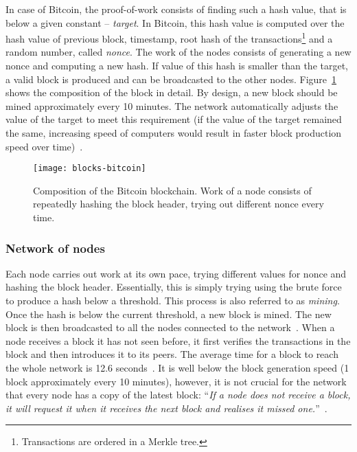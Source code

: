 In case of Bitcoin, the proof-of-work consists of finding such a hash value, that is below a given constant -- \textit{target}. In Bitcoin, this hash value is computed over the hash value of previous block, timestamp\footnotemark, root hash of the transactions\footnote{Transactions are ordered in a Merkle tree.} and a random number, called \textit{nonce}. The work of the nodes consists of generating a new nonce and computing a new hash. If value of this hash is smaller than the target, a valid block is produced and can be broadcasted to the other nodes. Figure~\ref{fig:blocks-bitcoin} shows the composition of the block in detail. By design, a new block should be mined approximately every 10 minutes. The network automatically adjusts the value of the target to meet this requirement (if the value of the target remained the same, increasing speed of computers would result in faster block production speed over time)~\cite{Decker2013InformationNetwork}.
% 
% 
\begin{figure}[ht]
    \centering
    \texttt{[image: blocks-bitcoin]}
    \caption{Composition of the Bitcoin blockchain. Work of a node consists of repeatedly hashing the block header, trying out different nonce every time.}
    \label{fig:blocks-bitcoin}
\end{figure}
% 
\subsubsection{Network of nodes}
Each node carries out work at its own pace, trying different values for nonce and hashing the block header. Essentially, this is simply trying using the brute force to produce a hash below a threshold. This process is also referred to as \textit{mining}. Once the hash is below the current threshold, a new block is mined. The new block is then broadcasted to all the nodes connected to the network~\cite{NakamotoBitcoin:System}. When a node receives a block it has not seen before, it first verifies the transactions in the block and then introduces it to its peers. The average time for a block to reach the whole network is 12.6 seconds~\cite{Decker2013InformationNetwork}. It is well below the block generation speed (1 block approximately every 10 minutes), however, it is not crucial for the network that every node has a copy of the latest block: ``\textit{If a node does not receive a block, it will request it when it receives the next block and realises it missed one.}''~\cite{NakamotoBitcoin:System}.
% 
